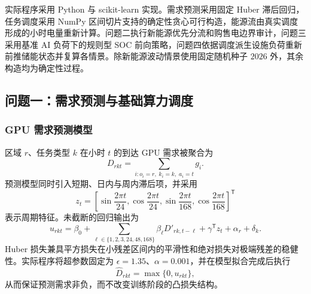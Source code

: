 
实际程序采用 Python 与 scikit-learn 实现。需求预测采用固定 Huber 滞后回归，任务调度采用 NumPy 区间切片支持的确定性贪心可行构造，能源流由真实调度形成的小时电量重新计算。问题二执行新能源优先分流和购售电边界审计，问题三采用基准 AI 负荷下的规则型 SOC 前向策略，问题四依据调度派生设施负荷重新前推储能状态并复算各情景。除新能源波动情景使用固定随机种子 $2026$ 外，其余构造均为确定性过程。

\subsection{问题一：需求预测与基础算力调度}

\subsubsection{GPU 需求预测模型}

区域 $r$、任务类型 $k$ 在小时 $t$ 的到达 GPU 需求被聚合为
\begin{equation}
D_{rkt}=\sum_{i:o_i=r,\;k_i=k,\;a_i=t}g_i.
\label{eq:demand_aggregation}
\end{equation}
预测模型同时引入短期、日内与周内滞后项，并采用
\begin{equation}
z_t=\left[
\sin\frac{2\pi t}{24},
\cos\frac{2\pi t}{24},
\sin\frac{2\pi t}{168},
\cos\frac{2\pi t}{168}
\right]^{\mathsf T}
\label{eq:periodic_features}
\end{equation}
表示周期特征。未截断的回归输出为
\begin{equation}
u_{rkt}=\beta_0+
\sum_{\ell\in\{1,2,3,24,48,168\}}
\beta_\ell D'_{rk,t-\ell}
+\gamma^{\mathsf T}z_t+\alpha_r+\delta_k.
\label{eq:huber_predictor}
\end{equation}
Huber 损失兼具平方损失在小残差区间内的平滑性和绝对损失对极端残差的稳健性\cite{huber1964robust}。实际程序将超参数固定为 $\epsilon=1.35$、$\alpha=0.001$，并在模型拟合完成后执行
\begin{equation}
\widehat D_{rkt}=\max\{0,u_{rkt}\},
\label{eq:nonnegative_prediction}
\end{equation}
从而保证预测需求非负，而不改变训练阶段的凸损失结构。

